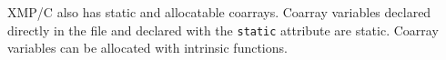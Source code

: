 XMP/C also has static and allocatable coarrays.
Coarray variables declared directly in the file and declared with 
the {\tt static} attribute are static.
Coarray variables can be allocated with intrinsic functions.



